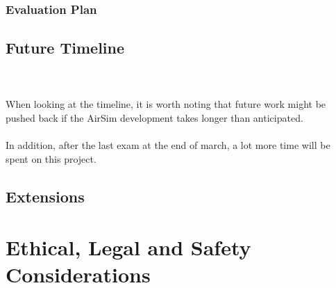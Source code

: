 \documentclass[12pt,oneside]{report}
\begin{document}
\subsection{Evaluation Plan}

\pagebreak
\section{Future Timeline} \label{timeline}

\\~\\
When looking at the timeline, it is worth noting that future work might be pushed back if the AirSim development takes longer than anticipated. 
\\~\\
In addition, after the last exam at the end of march, a lot more time will be spent on this project. 
\pagebreak
\section{Extensions}\label{Extensions}


\chapter{Ethical, Legal and Safety Considerations}



\newpage
\nocite{*}

\end{document}
